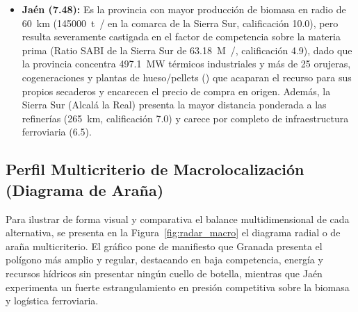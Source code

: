 \documentclass{report}
\begin{document}
\begin{itemize}
    \item \textbf{Jaén (\num{7.48}):} Es la provincia con mayor producción de biomasa en radio de \SI{60}{\kilo\metre} (\SI{145000}{\tonne{}/} en la comarca de la Sierra Sur, calificación \num{10.0}), pero resulta severamente castigada en el factor de competencia sobre la materia prima (Ratio SABI de la Sierra Sur de \SI{63.18}{M/}, calificación \num{4.9}), dado que la provincia concentra \SI{497.1}{\mega\watt} térmicos industriales y más de \num{25} orujeras, cogeneraciones y plantas de hueso/pellets (\textcite{AAE2026}) que acaparan el recurso para sus propios secaderos y encarecen el precio de compra en origen. Además, la Sierra Sur (Alcalá la Real) presenta la mayor distancia ponderada a las refinerías (\SI{265}{\kilo\metre}, calificación \num{7.0}) y carece por completo de infraestructura ferroviaria (\num{6.5}).
\end{itemize}

\subsection{Perfil Multicriterio de Macrolocalización (Diagrama de Araña)}
Para ilustrar de forma visual y comparativa el balance multidimensional de cada alternativa, se presenta en la Figura~\ref{fig:radar_macro} el diagrama radial o de araña multicriterio. El gráfico pone de manifiesto que Granada presenta el polígono más amplio y regular, destacando en baja competencia, energía y recursos hídricos sin presentar ningún cuello de botella, mientras que Jaén experimenta un fuerte estrangulamiento en presión competitiva sobre la biomasa y logística ferroviaria.
\end{document}
